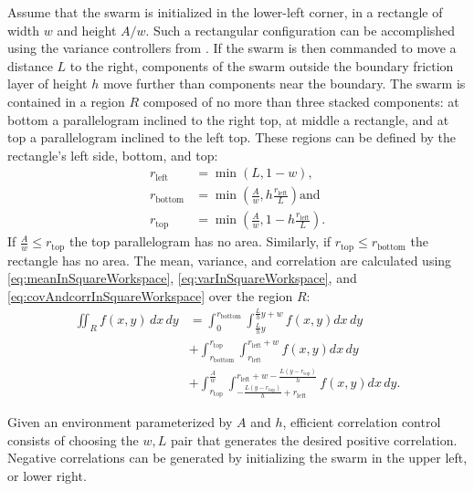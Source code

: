  Assume that the swarm is initialized in the lower-left corner, in a rectangle of width $w$ and height $A/w$. 
 Such a rectangular configuration can be accomplished using the variance controllers from \cite{ShahrokhiIROS2015}. 
  If the swarm is then commanded to move a distance $L$ to the right, components of the swarm outside the boundary friction layer of height $h$ move further than components near the boundary. 
   The swarm is contained in a region $R$ composed of no more than three stacked components: at bottom a parallelogram inclined to the right top, at middle a rectangle, and at top a parallelogram inclined to the left top. These regions can be defined by the rectangle's left side, bottom, and top:
\begin{align}
r_{\text{left}} &= \min (L,1-w),\nonumber \\
r_{\text{bottom}} &=\min \left(\frac{A}{w}, h\frac{r_{\textrm{left}}}{L}  \right) \text{and}\nonumber \\
r_{\text{top}}  &= \min \left(\frac{A}{w}, 1-h\frac{r_{\text{left}}}{L}  \right).
\end{align}
If $\frac{A}{w} \le r_{\text{top}}$ the top parallelogram has no area. 
 Similarly, if $r_{\text{top}} \le r_{\text{bottom}}$ the rectangle has no area. 
The mean, variance, and correlation are calculated  using \eqref{eq:meanInSquareWorkspace}, \eqref{eq:varInSquareWorkspace}, and \eqref{eq:covAndcorrInSquareWorkspace} over the region $R$:
\begin{align} \iint_R f(x,y) \, dx \,dy &=  \int_0^{r_{\text{bottom}}}  \int_{\frac{L}{h}y}^{\frac{L}{h}y+w}  f(x,y)  dx \, dy \label{eq:correlationFriction} \\
&+\int_{r_{\text{bottom}}}^{r_{\text{top}}} \int_{r_{\text{left}}}^{r_{\text{left}} +w} f(x,y)    dx \, dy \nonumber\\
&+\int_{r_{\text{top}}}^{\frac{A}{w}} \int_{-\frac{L (y-r_{\text{top}})}{h}+r_{\text{left}}}^{r_{\text{left}}+w-\frac{L (y-r_{\text{top}})}{h}} f(x,y)   dx \, dy .\nonumber
\end{align}
 
 Given an environment parameterized by $A$ and $h$, efficient correlation control consists of choosing the $w,L$ pair  that generates the desired positive correlation.
  Negative correlations can be generated by initializing the swarm in the upper left, or lower right.

